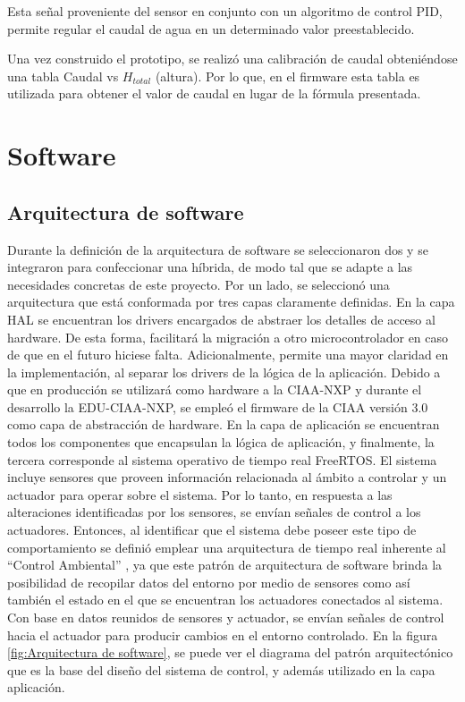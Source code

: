 Esta señal proveniente del sensor en conjunto con un algoritmo de control PID, permite regular el caudal de agua en un determinado valor preestablecido. 

Una vez construido el prototipo, se realizó una calibración de caudal obteniéndose una tabla Caudal vs $H_{total}$ (altura). Por lo que, en el firmware esta tabla es utilizada para obtener el valor de caudal  en lugar de la fórmula presentada.

\section{Software}
\subsection{Arquitectura de software}
\label{subsec:Arquitectura de software}

Durante la definición de la arquitectura de software se seleccionaron dos  y se integraron para confeccionar una híbrida, de modo tal que se adapte a las necesidades concretas de este proyecto. Por un lado, se seleccionó una arquitectura que está conformada por tres capas claramente definidas.
En la capa HAL se encuentran los drivers encargados de abstraer los detalles de acceso al hardware. De esta forma, facilitará la migración a otro microcontrolador en caso de que en el futuro hiciese falta. Adicionalmente, permite una mayor claridad en la implementación, al separar los drivers de la lógica de la aplicación.
Debido a que en producción se utilizará como hardware a la CIAA-NXP y durante el desarrollo la EDU-CIAA-NXP, se empleó el firmware de la CIAA versión 3.0 como capa de abstracción de hardware. 
En la capa de aplicación se encuentran todos los componentes que encapsulan la lógica de aplicación, y finalmente, la tercera corresponde al sistema operativo de tiempo real FreeRTOS.
El sistema incluye sensores que proveen información relacionada al ámbito a controlar y un actuador para operar sobre el sistema. Por lo tanto, en respuesta a las alteraciones identificadas por los sensores, se envían señales de control a los actuadores. Entonces, al identificar que el sistema debe poseer este tipo de comportamiento se definió emplear una arquitectura de tiempo real inherente al “Control Ambiental” \citep{INGSOF} , ya que este patrón de arquitectura de software brinda la posibilidad de recopilar datos del entorno por medio de sensores como así también el estado en el que se encuentran los actuadores conectados al sistema. Con base en datos reunidos de sensores y actuador, se envían señales de control hacia el actuador para producir cambios en el entorno controlado. En la figura \ref{fig:Arquitectura de software}, se puede ver el diagrama del patrón arquitectónico que es la base del diseño del sistema de control, y además utilizado en la capa aplicación. 

